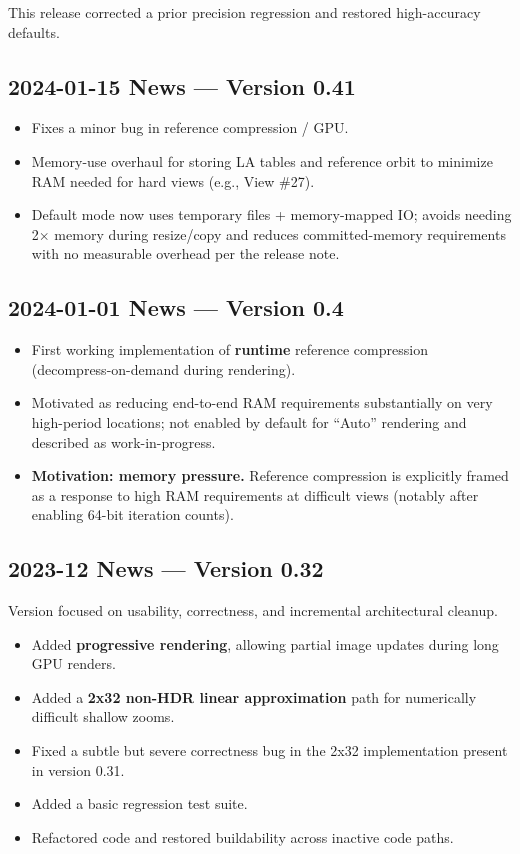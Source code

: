 This release corrected a prior precision regression and restored high-accuracy defaults.


\subsection{2024-01-15 News --- Version 0.41}

\begin{itemize}
  \item Fixes a minor bug in reference compression / GPU.
  \item Memory-use overhaul for storing LA tables and reference orbit to minimize RAM needed for hard views (e.g., View \#27).
  \item Default mode now uses temporary files + memory-mapped IO; avoids needing 2$\times$ memory during resize/copy and reduces committed-memory requirements with no measurable overhead per the release note.
\end{itemize}


\subsection{2024-01-01 News --- Version 0.4}

\begin{itemize}
  \item First working implementation of \textbf{runtime} reference compression
  (decompress-on-demand during rendering).

  \item Motivated as reducing end-to-end RAM requirements substantially on very
  high-period locations; not enabled by default for “Auto” rendering and
  described as work-in-progress.

  \item \textbf{Motivation: memory pressure.} Reference compression is
  explicitly framed as a response to high RAM requirements at difficult views
  (notably after enabling 64-bit iteration counts).
\end{itemize}


\subsection{2023-12 News --- Version 0.32}

Version  focused on usability, correctness, and incremental architectural cleanup.

\begin{itemize}
  \item Added \textbf{progressive rendering}, allowing partial image updates
  during long GPU renders.
  \item Added a \textbf{2x32 non-HDR linear approximation} path for numerically
  difficult shallow zooms.
  \item Fixed a subtle but severe correctness bug in the 2x32 implementation
  present in version 0.31.
  \item Added a basic regression test suite.
  \item Refactored code and restored buildability across inactive code paths.
\end{itemize}


